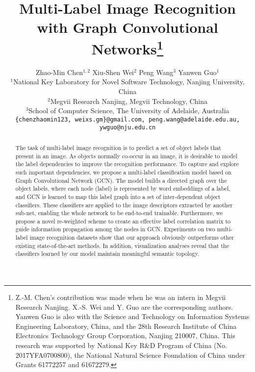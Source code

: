 \documentclass[10pt,twocolumn,letterpaper]{article}
\begin{document}
\title{Multi-Label Image Recognition with Graph Convolutional Networks\thanks{Z.-M. Chen's contribution was made when he was an intern in Megvii Research Nanjing. X.-S. Wei and Y. Guo are the corresponding authors. Yanwen Guo is also with the Science and Technology on Information Systems Engineering Laboratory, China, and the 28th Research Institute of China Electronics Technology Group Corporation, Nanjing 210007, China. This research was supported by National Key R\&D Program of China (No. 2017YFA0700800), the National Natural Science Foundation of China under Grants 61772257 and 61672279.
}}

\author{Zhao-Min Chen$^{1,2}$ \qquad Xiu-Shen Wei$^{2}$ \qquad Peng Wang$^{3}$ \qquad Yanwen Guo$^{1}$\\
\noindent $^1$National Key Laboratory for Novel Software Technology, Nanjing University, China\\
$^2$Megvii Research Nanjing, Megvii Technology, China\\
$^3$School of Computer Science, The University of Adelaide, Australia\\
{\tt\small \{chenzhaomin123, weixs.gm\}@gmail.com, peng.wang@adelaide.edu.au, ywguo@nju.edu.cn}\\}

\maketitle
\thispagestyle{empty}

\begin{abstract}
The task of multi-label image recognition is to predict a set of object labels that present in an image. As objects normally co-occur in an image, it is desirable to model the label dependencies to improve the recognition performance. To capture and explore such important dependencies, we propose a multi-label classification model based on Graph Convolutional Network (GCN). The model builds a directed graph over the object labels, where each node (label) is represented by word embeddings of a label, and GCN is learned to map this label graph into a set of inter-dependent object classifiers. These classifiers are applied to the image descriptors extracted by another sub-net, enabling the whole network to be end-to-end trainable. Furthermore, we propose a novel re-weighted scheme to create an effective label correlation matrix to guide information propagation among the nodes in GCN. Experiments on two multi-label image recognition datasets show that our approach obviously outperforms other existing state-of-the-art methods. In addition, visualization analyses reveal that the classifiers learned by our model maintain meaningful semantic topology.
\end{abstract}
\end{document}
